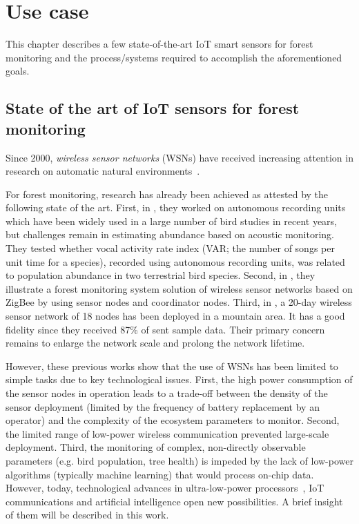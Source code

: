 \documentclass{EPL-master-thesis-covers-EN}
\begin{document}
\chapter{Use case}

This chapter describes a few state-of-the-art IoT smart sensors for forest monitoring and the process/systems required to accomplish the aforementioned goals.

\section{State of the art of IoT sensors for forest monitoring}

Since 2000, \textit{wireless sensor networks} (WSNs) have received increasing attention in research on automatic natural environments~\cite{Akyildiz}. 

For forest monitoring, research has already been achieved as attested by the following state of the art. First, in \cite{Granados}, they worked on autonomous recording units which have been widely used in a large number of bird studies in recent years, but challenges remain in estimating abundance based on acoustic monitoring. They tested whether vocal activity rate index (VAR; the number of songs per unit time for a species), recorded using autonomous recording units, was related to population abundance in two terrestrial bird species. Second, in \cite{Huanqi}, they illustrate a forest monitoring system solution of wireless sensor networks based on ZigBee by using sensor nodes and coordinator nodes. Third, in \cite{Jiang}, a 20-day wireless sensor network of 18 nodes has been deployed in a mountain area. It has a good fidelity since they received 87\% of sent sample data. Their primary concern remains to enlarge the network scale and prolong the network lifetime.

However, these previous works show that the use of WSNs has been limited to simple tasks due to key technological issues. First, the high power consumption of the sensor nodes in operation leads to a trade-off between the density of the sensor deployment (limited by the frequency of battery replacement by an operator) and the complexity of the ecosystem parameters to monitor. Second, the limited range of low-power wireless communication prevented large-scale deployment. Third, the monitoring of complex, non-directly observable parameters (e.g. bird population, tree health) is impeded by the lack of low-power algorithms (typically machine learning) that would process on-chip data. However, today, technological advances in ultra-low-power processors~\cite{8662293}, IoT communications and artificial intelligence open new possibilities. A brief insight of them will be described in this work.
\end{document}
